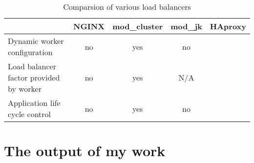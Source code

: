 \documentclass[
  master,
  biblatex,
  glossaries,
  index
]{kidiplom}
\begin{document}
\begin{table}[]
\centering
\caption{Comparsion of various load balancers}
\label{my-label}
\begin{tabularx}{\linewidth}{X|cccc}
                                        & NGINX                             & mod\_cluster              & mod\_jk          & HAproxy \\ \hline
Dynamic worker configuration            & no\cite{bib:nginxlb}              & yes\cite{bib:modcluster}  & no               &         \\
Load balancer factor provided by worker & no\cite{bib:nginxlb}              & yes\cite{bib:modcluster}  & N/A\footnotemark &         \\
Application life cycle control          & no\footnotemark\cite{bib:nginxlb} & yes\cite{bib:modcluster}  & no               &
\end{tabularx}
\end{table}


\section{The output of my work}


\printbibliography
\end{document}
